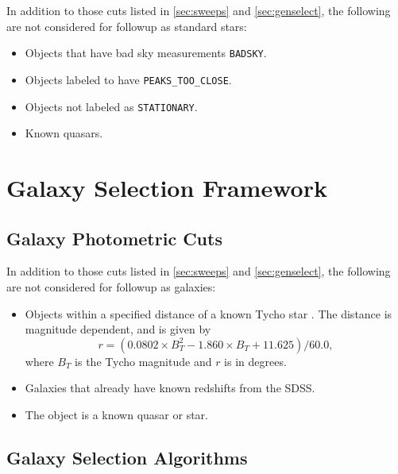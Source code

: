 \documentclass[12pt,preprint]{aastex}
\begin{document}
In addition to those cuts listed in \ref{sec:sweeps} and \ref{sec:genselect},
the following are not considered for followup as standard stars:

\begin{itemize}

    \item Objects that have bad sky measurements \texttt{BADSKY}.
    \item Objects labeled to have \texttt{PEAKS\_TOO\_CLOSE}.
    \item Objects not labeled as \texttt{STATIONARY}.
    \item Known quasars.
   
\end{itemize}



\section{Galaxy Selection Framework} \label{sec:galframe}

\subsection{Galaxy Photometric Cuts}

In addition to those cuts listed in \ref{sec:sweeps} and \ref{sec:genselect},
the following are not considered for followup as galaxies:

\begin{itemize}



    \item Objects within a specified distance of a known Tycho star
    \citep{tycho2}.  The distance is magnitude dependent, and is given 
    by
    \begin{equation}
    r = (0.0802\times B_T^2 - 1.860\times B_T + 11.625)/60.0,
    \end{equation}
    where $B_T$ is the Tycho magnitude and $r$ is in degrees.

    \item Galaxies that already have known redshifts from the SDSS.

    \item The object is a known quasar or star.

\end{itemize}

\subsection{Galaxy Selection Algorithms}
\end{document}
